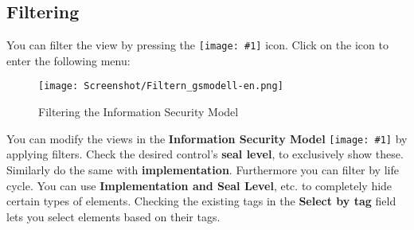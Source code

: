 \documentclass[a4paper,10pt]{book}
\newcommand{\icon}[1]{\texttt{[image: \#1]}}
\begin{document}
\subsection{Filtering}
You can filter the view by pressing the \icon{Icon/Filter.png} icon.
Click on the icon to enter the following menu:
\newline
\begin{figure}[htb!]
  \centering
  \texttt{[image: Screenshot/Filtern\_gsmodell-en.png]}
  \caption{\label{Filtering the Information Security Model} Filtering the Information Security Model}
\end{figure}
\newline
You can modify the views in the \textbf{Information Security Model} \icon{Icon/GS_Modell.png} by applying filters.
Check the desired control's \textbf{seal level}, to exclusively show these. Similarly do the same with \textbf{implementation}. Furthermore you can filter by life cycle. You can use \textbf{Implementation and Seal Level}, etc. to completely hide certain types of elements. Checking the existing tags in the \textbf{Select by tag} field lets you select elements based on their tags.
\end{document}
